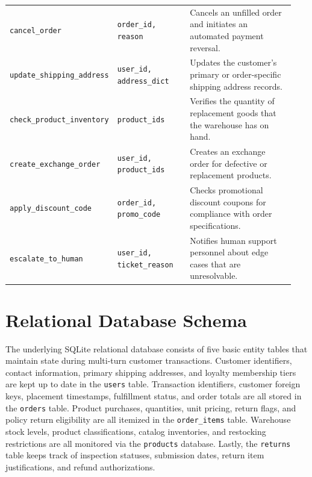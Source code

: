 \documentclass[a4paper, 12pt]{report}
\begin{document}
\begin{longtable}{p{0.28\linewidth}p{0.26\linewidth}p{0.40\linewidth}}
\texttt{cancel\_order} & \texttt{order\_id, reason} & Cancels an unfilled order and initiates an automated payment reversal. \\
\texttt{update\_shipping\_address} & \texttt{user\_id, address\_dict} & Updates the customer's primary or order-specific shipping address records. \\
\texttt{check\_product\_inventory} & \texttt{product\_ids} & Verifies the quantity of replacement goods that the warehouse has on hand. \\
\texttt{create\_exchange\_order} & \texttt{user\_id, product\_ids} & Creates an exchange order for defective or replacement products. \\
\texttt{apply\_discount\_code} & \texttt{order\_id, promo\_code} & Checks promotional discount coupons for compliance with order specifications. \\
\texttt{escalate\_to\_human} & \texttt{user\_id, ticket\_reason} & Notifies human support personnel about edge cases that are unresolvable. \\
\end{longtable}
\endgroup

\section{Relational Database Schema}
The underlying SQLite relational database consists of five basic entity tables that maintain state during multi-turn customer transactions. Customer identifiers, contact information, primary shipping addresses, and loyalty membership tiers are kept up to date in the \texttt{users} table. Transaction identifiers, customer foreign keys, placement timestamps, fulfillment status, and order totals are all stored in the \texttt{orders} table. Product purchases, quantities, unit pricing, return flags, and policy return eligibility are all itemized in the \texttt{order\_items} table. Warehouse stock levels, product classifications, catalog inventories, and restocking restrictions are all monitored via the \texttt{products} database. Lastly, the \texttt{returns} table keeps track of inspection statuses, submission dates, return item justifications, and refund authorizations.

\ifdefined\isincluded
\else
\end{document}
